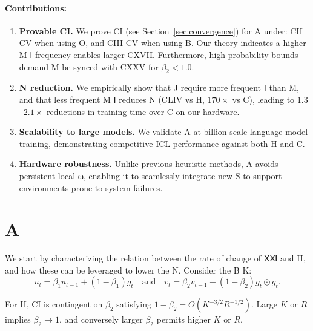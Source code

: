 \documentclass{article}
\begin{document}
\paragraph{Contributions:}
\begin{enumerate}
    \item \textbf{Provable CI.} We prove CI (see Section~\ref{sec:convergence}) for A under: CII
    CV when using O, and CIII CV when using B. Our theory indicates a higher M Ⅰ frequency enables larger CXVII.
    Furthermore, high-probability bounds demand M be synced with CXXV for $\beta_2 < 1.0$.

    \item \textbf{N reduction.} We empirically show that J require more frequent Ⅰ than
    M, and that less frequent M Ⅰ reduces N ($\text{CLIV}$ vs H, $170\times$ vs C), leading to $1.3$--$2.1\times$ reductions in training time over C on our hardware.

    \item \textbf{Scalability to large models.} We validate A at billion-scale language model training,
    demonstrating competitive ICL performance against both H and C.

    \item \textbf{Hardware robustness.} Unlike previous heuristic methods, A avoids persistent local ω,
    enabling it to seamlessly integrate new S to support environments prone to system failures.
\end{enumerate}

\section{A}
\label{sec:desloc}

We start by characterizing the relation between the rate of change of ⅩⅪ and H, and how these can be leveraged to lower the N. Consider the B K:
\begin{equation}
u_t = \beta_1 u_{t-1} + (1 - \beta_1) g_t \quad \text{and} \quad v_t = \beta_2 v_{t-1} + (1 - \beta_2) g_t \odot g_t.
\end{equation}

For H, CI is contingent on $\beta_2$ satisfying $1 - \beta_2 = \tilde{O}(K^{-3/2} R^{-1/2})$. Large
$K$ or $R$ implies $\beta_2 \to 1$, and conversely larger $\beta_2$ permits higher $K$ or $R$.
\end{document}
